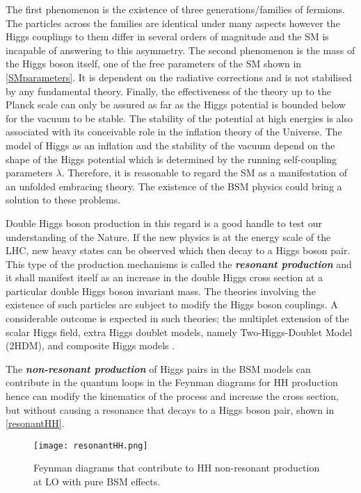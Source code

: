 The first phenomenon is the existence of three generations/families of fermions. The particles across the families are identical under many aspects however the Higgs couplings to them differ in several orders of magnitude and the SM is incapable of answering to this asymmetry. The second phenomenon is the mass of the Higgs boson itself, one of the free parameters of the SM shown in \autoref{SMparameters}. It is dependent on the radiative corrections and is not stabilised by any fundamental theory. Finally, the effectiveness of the theory up to the Planck scale can only be assured as far as the Higgs potential is bounded below for the vacuum to be stable. The stability of the potential at high energies is also associated with its conceivable role in the inflation theory of the Universe\cite{Bezrukov2008}. The model of Higgs as an inflation and the stability of the vacuum depend on the shape of the Higgs potential which is determined by the running self-coupling parameters $\lambda$. Therefore, it is reasonable to regard the SM as a manifestation of an unfolded embracing theory. The existence of the BSM physics could bring a solution to these problems.

Double Higgs boson production in this regard is a good handle to test our understanding of the Nature. If the new physics is at the energy scale of the LHC, new heavy states can be observed which then decay to a Higgs boson pair. This type of the production mechanisms is called the \textbf{\textit{resonant production}} and it shall manifest itself as an increase in the double Higgs cross section at a particular double Higgs boson invariant mass. The theories involving the existence of such particles are subject to modify the Higgs boson couplings. A considerable outcome is expected in such theories; the multiplet extension of the scalar Higgs field\cite{Dawson2017}, extra Higgs doublet models, namely Two-Higgs-Doublet Model (2HDM)\cite{Branco2012, BluscaMato2017}, and composite Higgs models \cite{Grber2011, contino2010tasi, JHEP08-2014-095}.

The \textbf{\textit{non-resonant production}} of Higgs pairs in the BSM models can contribute in the quantum loops in the Feynman diagrams for HH production hence can modify the kinematics of the process and increase the cross section, but without causing a resonance that decays to a Higgs boson pair, shown in \autoref{resonantHH}. %


\begin{figure}[ht]
	\centering
	\texttt{[image: resonantHH.png]}
	\vspace{2mm}
	\caption[Feynman diagrams that contribute to HH non-resonant production at LO with pure BSM effects.]
	{Feynman diagrams that contribute to HH non-resonant production at LO with pure BSM effects.}
	\label{resonantHH}
\end{figure}


\newpage